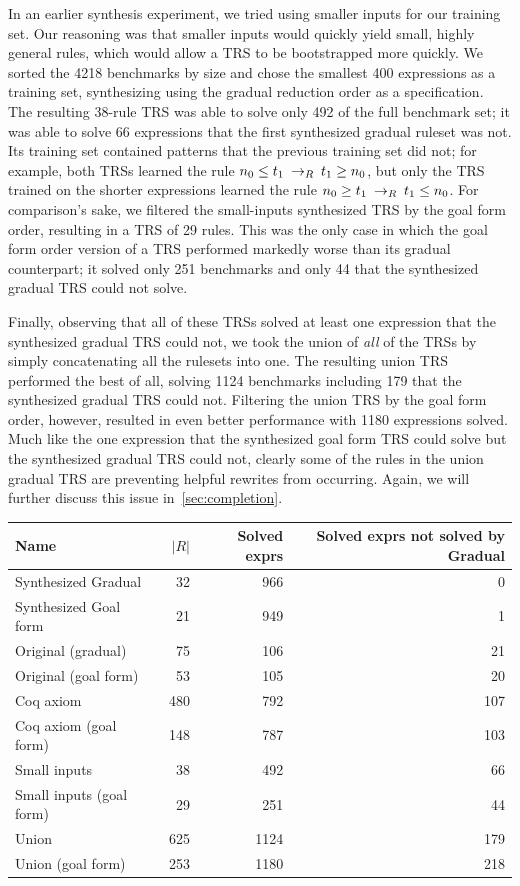 In an earlier synthesis experiment, we tried using smaller inputs for our training set. Our reasoning was that smaller inputs would quickly yield small, highly general rules, which would allow a TRS to be bootstrapped more quickly. We sorted the 4218 benchmarks by size and chose the smallest 400 expressions as a training set, synthesizing using the gradual reduction order as a specification. The resulting 38-rule TRS was able to solve only 492 of the full benchmark set; it was able to solve 66 expressions that the first synthesized gradual ruleset was not. Its training set contained patterns that the previous training set did not; for example, both TRSs learned the rule $n_0 \leq t_1 \:\rightarrow_{R}\: t_1 \geq n_0$, but only the TRS trained on the shorter expressions learned the rule $n_0 \geq t_1 \:\rightarrow_{R}\: t_1 \leq n_0$. For comparison's sake, we filtered the small-inputs synthesized TRS by the goal form order, resulting in a TRS of 29 rules. This was the only case in which the goal form order version of a TRS performed markedly worse than its gradual counterpart; it solved only 251 benchmarks and only 44 that the synthesized gradual TRS could not solve.

Finally, observing that all of these TRSs solved at least one expression that the synthesized gradual TRS could not, we took the union of \emph{all} of the TRSs by simply concatenating all the rulesets into one. The resulting union TRS performed the best of all, solving 1124 benchmarks including 179 that the synthesized gradual TRS could not. Filtering the union TRS by the goal form order, however, resulted in even better performance with 1180 expressions solved. Much like the one expression that the synthesized goal form TRS could solve but the synthesized gradual TRS could not, clearly some of the rules in the union gradual TRS are preventing helpful rewrites from occurring. Again, we will further discuss this issue in~\ref{sec:completion}.

\begin{tabular}{l|r|r|r}
Name & $|R|$ & Solved exprs & Solved exprs not solved by Gradual \\
\hline
Synthesized Gradual & 32 & 966 & 0 \\
Synthesized Goal form & 21 & 949 & 1 \\
Original (gradual) & 75 & 106 & 21 \\
Original (goal form) & 53 & 105 & 20 \\ 
Coq axiom & 480 & 792 & 107 \\
Coq axiom (goal form) & 148 & 787 & 103 \\
Small inputs & 38 & 492 & 66 \\
Small inputs (goal form) & 29 & 251 & 44 \\
Union & ~625 & 1124 & 179 \\
Union (goal form) & ~253 & 1180 & 218
\end{tabular}


